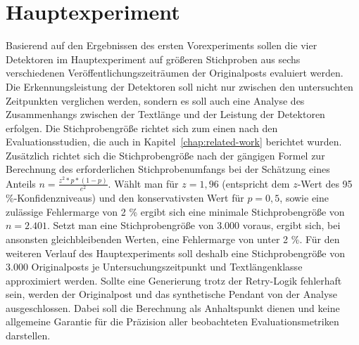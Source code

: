 \section{Hauptexperiment}
\label{subsec:Hauptexperiment}
Basierend auf den Ergebnissen des ersten Vorexperiments sollen die vier Detektoren im Hauptexperiment auf größeren Stichproben aus sechs verschiedenen Veröffentlichungszeiträumen der Originalposts evaluiert werden. Die Erkennungsleistung der Detektoren soll nicht nur zwischen den untersuchten Zeitpunkten verglichen werden, sondern es soll auch eine Analyse des Zusammenhangs zwischen der Textlänge und der Leistung der Detektoren erfolgen. Die Stichprobengröße richtet sich zum einen nach den Evaluationsstudien, die auch in Kapitel~\ref{chap:related-work} berichtet wurden. Zusätzlich richtet sich die Stichprobengröße nach der gängigen Formel zur Berechnung des erforderlichen Stichprobenumfangs bei der Schätzung eines Anteils \( n = \frac{z^{2}*p *(1-p)}{e^{2}}\). Wählt man für \( z = 1,96 \) (entspricht dem \( z \)-Wert des 95 \%-Konfidenzniveaus) und den konservativsten Wert für \( p = 0,5 \), sowie eine zulässige Fehlermarge von 2 \% ergibt sich eine minimale Stichprobengröße von \( n = 2.401 \). Setzt man eine Stichprobengröße von 3.000 voraus, ergibt sich, bei ansonsten gleichbleibenden Werten, eine Fehlermarge von unter 2 \%. Für den weiteren Verlauf des Hauptexperiments soll deshalb eine Stichprobengröße von 3.000 Originalposts je Untersuchungszeitpunkt und Textlängenklasse approximiert werden. Sollte eine Generierung trotz der Retry-Logik fehlerhaft sein, werden der Originalpost und das synthetische Pendant von der Analyse ausgeschlossen. Dabei soll die Berechnung als Anhaltspunkt dienen und keine allgemeine Garantie für die Präzision aller beobachteten Evaluationsmetriken darstellen.\\
